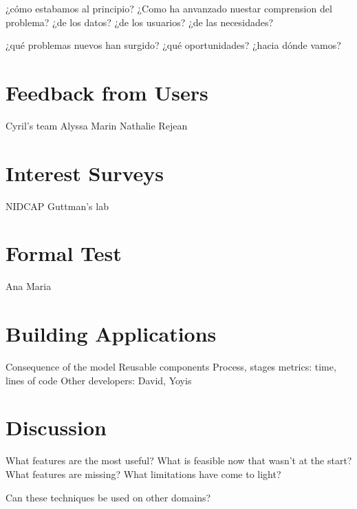 
¿cómo estabamos al principio?
¿Como ha anvanzado nuestar comprension del problema?
¿de los datos?
¿de los usuarios?
¿de las necesidades?

¿qué problemas nuevos han surgido?
¿qué oportunidades?
¿hacia dónde vamos?

\section{Feedback from Users}

Cyril's team
Alyssa
Marin
Nathalie
Rejean

\section{Interest Surveys}
NIDCAP
Guttman's lab

\section{Formal Test}

Ana Maria

\section{Building Applications}

Consequence of the model
Reusable components
Process, stages
metrics: time, lines of code
Other developers: David, Yoyis


\section{Discussion}

What features are the most useful?
What is feasible now that wasn't at the start?
What features are missing?
What limitations have come to light?

Can these techniques be used on other domains?



